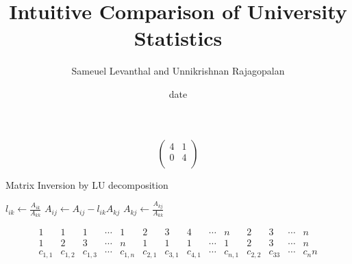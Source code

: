 \documentclass[11pt, a4paper]{article}
\title{Intuitive Comparison of University Statistics
}
\author{Sameuel Levanthal and Unnikrishnan Rajagopalan}
\date{date}
\begin{document}
\maketitle





\iffalse

%
%
\begin{figure}[H]
\label{fig:prob1fig}
\end{figure}

%
%
\[ \begin{pmatrix}
  4 & 1 \\
  0 & 4 \\
\end{pmatrix}\]

%
%
  \begin{algorithm}[H]
\caption{Matrix Inversion by LU decomposition}
\begin{algorithmic}
              \State $l_{ik} \leftarrow \frac{A_{ik}}{A_{kk}}$ 
                        \State $A_{ij} \leftarrow A_{ij} - l_{ik}A_{kj}$ 
                    \EndFor
                    \EndIf
                    \State $A_{kj} \leftarrow \frac{A_{kj}}{A_{kk}}$ 
                    \EndFor
      \EndFor
  \EndFor
\end{algorithmic}
\end{algorithm}

%
%
  \[
  \begin{smallmatrix}
    1 & 1 & 1 & \cdots & 1 & 2 & 3 & 4 & \cdots & n & 2 & 3 & \cdots &n\\
    1 & 2 & 3 & \cdots & n & 1 & 1 & 1 & \cdots & 1 & 2 & 3 & \cdots & n\\
    c_{1,1} & c_{1,2} & c_{1,3} & \cdots & c_{1,n} & c_{2,1} & c_{3,1} & c_{4,1} & \cdots & c_{n,1} & c_{2,2} & c_33 &\cdots &c_nn\\
  \end{smallmatrix}
\]

%
%
\noindent{}
\end{document}
